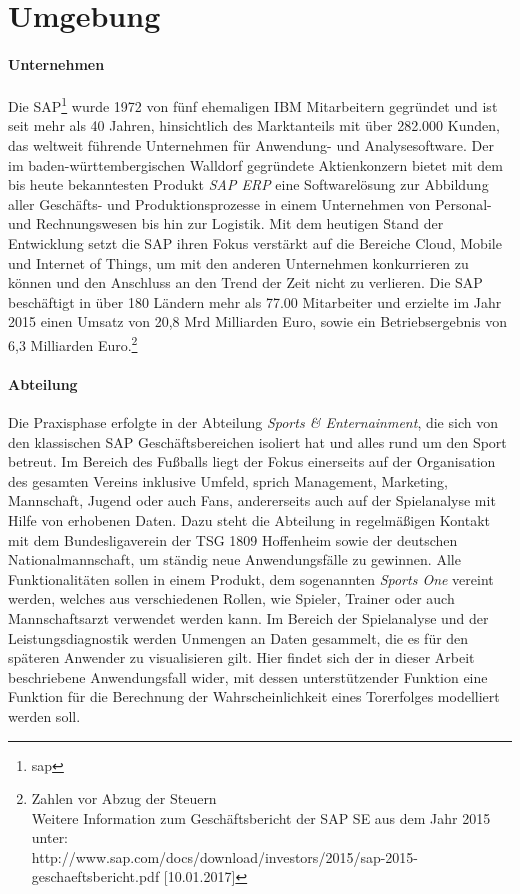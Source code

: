 \section{Umgebung}
\paragraph{Unternehmen}
Die SAP\footnote{\gls{sap}} wurde 1972 von fünf ehemaligen IBM Mitarbeitern gegründet und ist seit mehr als 40 Jahren, hinsichtlich des Marktanteils mit über 282.000 Kunden, das weltweit führende Unternehmen für Anwendung- und Analysesoftware. Der im baden-württembergischen Walldorf gegründete Aktienkonzern bietet mit dem bis heute bekanntesten Produkt \textit{SAP ERP} eine Softwarelösung zur Abbildung aller Geschäfts- und Produktionsprozesse in einem Unternehmen von Personal- und Rechnungswesen bis hin zur Logistik. Mit dem heutigen Stand der Entwicklung setzt die SAP ihren Fokus verstärkt auf die Bereiche Cloud, Mobile und Internet of Things, um mit den anderen Unternehmen konkurrieren zu können und den Anschluss an den Trend der Zeit nicht zu verlieren. Die SAP beschäftigt in über 180 Ländern mehr als 77.00 Mitarbeiter und erzielte im Jahr 2015 einen Umsatz von 20,8 Mrd Milliarden Euro, sowie ein Betriebsergebnis von 6,3 Milliarden Euro.\footnote{Zahlen vor Abzug der Steuern\\ Weitere Information zum Geschäftsbericht der SAP SE aus dem Jahr 2015 unter: \\ http://www.sap.com/docs/download/investors/2015/sap-2015-geschaeftsbericht.pdf [10.01.2017]}

\paragraph{Abteilung}
Die Praxisphase erfolgte in der Abteilung \textit{Sports \& Enternainment}, die sich von den klassischen SAP Geschäftsbereichen isoliert hat und alles rund um den Sport betreut. Im Bereich des Fußballs liegt der Fokus einerseits auf der Organisation des gesamten Vereins inklusive Umfeld, sprich Management, Marketing, Mannschaft, Jugend oder auch Fans, andererseits auch auf der Spielanalyse mit Hilfe von erhobenen Daten. Dazu steht die Abteilung in regelmäßigen Kontakt mit dem Bundesligaverein der TSG 1809 Hoffenheim sowie der deutschen Nationalmannschaft, um ständig neue Anwendungsfälle zu gewinnen. Alle Funktionalitäten sollen in einem Produkt, dem sogenannten \textit{Sports One} vereint werden, welches aus verschiedenen Rollen, wie Spieler, Trainer oder auch Mannschaftsarzt verwendet werden kann. Im Bereich der Spielanalyse und der Leistungsdiagnostik werden Unmengen an Daten gesammelt, die es für den späteren Anwender zu visualisieren gilt. Hier findet sich der in dieser Arbeit beschriebene Anwendungsfall wider, mit dessen unterstützender Funktion eine Funktion für die Berechnung der Wahrscheinlichkeit eines Torerfolges modelliert werden soll.